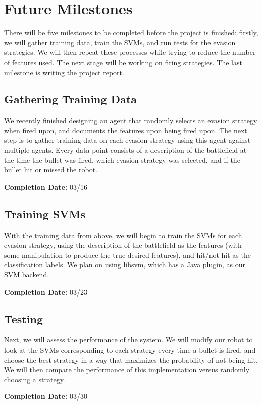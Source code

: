 \documentclass{article}
\theoremstyle{plain}
\theoremstyle{definition}
\theoremstyle{remark}
\begin{document}
\section{Future Milestones}
There will be five milestones to be completed before the project is finished: firstly, we will gather training data, train the SVMs,
and run tests for the evasion strategies. We will then repeat these processes while trying to reduce the number of features used. The next stage will be working on firing strategies. The last milestone is writing the
project report.

\subsection*{Gathering Training Data}
We recently finished designing an agent that randomly selects an evasion strategy when fired upon, and documents the features upon being fired upon. The next step is to gather training data on each evasion strategy using this agent against multiple agents. Every data point consists of a description of the battlefield at the time the bullet was fired, which evasion strategy was selected, and if the bullet hit or missed the robot.

{\bf Completion Date:}  03/16

\subsection*{Training SVMs}
With the training data from above, we will begin to train the SVMs for each evasion strategy, using the description of the battlefield as the features (with some manipulation to produce the true desired features), and hit/not hit as the classification labels. We plan on using libsvm, which has a Java plugin, as our SVM backend.

{\bf Completion Date:}   03/23

\subsection*{Testing}
Next, we will assess the performance of the system. We will modify our robot to look at the SVMs corresponding to each strategy every time a bullet is fired, and choose the best strategy in a way that maximizes the probability of not being hit. We will then compare the performance of this implementation versus randomly choosing a strategy.

{\bf Completion Date:}  03/30
\end{document}
